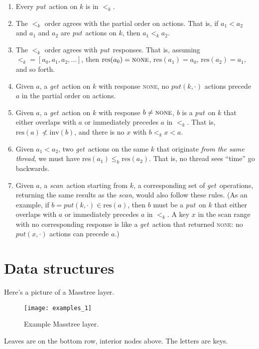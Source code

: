\documentclass[11pt]{article}
\newcommand{\NONE}{\textsc{none}}
\newcommand{\sysget}{\textit{get}}
\newcommand{\sysput}{\textit{put}}
\newcommand{\sysscan}{\textit{scan}}
\newcommand{\Inv}[1]{\ensuremath{\textrm{inv}(#1)}}
\newcommand{\Res}[1]{\ensuremath{\textrm{res}(#1)}}
\newcommand{\Precedes}{<}
\newcommand{\NotPrecedes}{\not <}
\newcommand{\PrecedesK}[1]{\ensuremath{\mathrel{<_{#1}}}}
\newcommand{\PrecedesEqK}[1]{\ensuremath{\mathrel{\leq_{#1}}}}
\begin{document}
\begin{enumerate}
\item Every \sysput\ action on $k$ is in \(\PrecedesK{k}\).
\item The \(\PrecedesK{k}\) order agrees with the partial order on actions. That is, if $a_1 \Precedes a_2$ and $a_1$ and $a_2$ are \sysput\ actions on $k$, then $a_1 \PrecedesK{k} a_2$.
\item The \(\PrecedesK{k}\) order agrees with \sysput\ responses. That is, assuming $\mathord{\PrecedesK{k}} = [a_0, a_1, a_2, \dots]$, then $\Res{a_0} = \NONE$, $\Res{a_1} = a_0$, $\Res{a_2} = a_1$, and so forth.
\item Given \(a\), a \sysget\ action on $k$ with response \NONE, no
  \(\sysput(k, \cdot)\) actions precede \(a\) in the partial order on actions.
\item Given \(a\), a \sysget\ action on $k$ with response $b \neq \NONE$, $b$ is a \sysput\ on $k$ that either overlaps with $a$ or immediately precedes $a$ in $\PrecedesK{k}$. That is, $\Res{a} \NotPrecedes \Inv{b}$, and there is no $x$ with $b \PrecedesK{k} x \Precedes a$.
\item Given \(a_1 \Precedes a_2\), two \sysget\ actions on the same $k$ that originate \emph{from the same thread}, we must have \(\Res{a_1} \PrecedesEqK{k} \Res{a_2}\). That is, no thread sees ``time'' go backwards.
\item Given \(a\), a \sysscan\ action starting from $k$, a corresponding set of \sysget\ operations, returning the same results as the \sysscan, would also follow these rules. (As an example, if \(b = \sysput(k, \cdot) \in \Res{a}\), then $b$ must be a \sysput\ on $k$ that either overlaps with $a$ or immediately precedes $a$ in $\PrecedesK{k}$. A key $x$ in the scan range with no corresponding response is like a \sysget\ action that returned \NONE: no \(\sysput(x, \cdot)\) actions can precede \(a\).)
\end{enumerate}


\section{Data structures}

Here's a picture of a Masstree layer.

\begin{figure}[H]
\texttt{[image: examples\_1]}
\caption{Example Masstree layer.}
\end{figure}

\noindent
Leaves are on the bottom row, interior nodes above. The letters are
keys.
\end{document}
